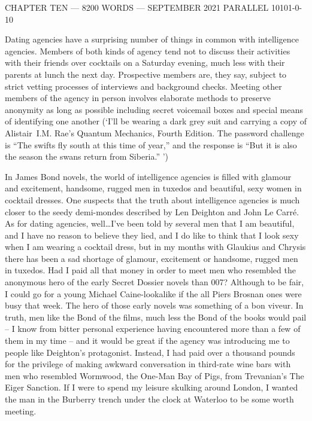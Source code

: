 {\parindent=0pt {\obeylines
{\twelvess CHAPTER TEN --- 8200 WORDS --- SEPTEMBER 2021}
{\twelvess PARALLEL 10101-0-10}}
\vskip 1cm

\twelverm
Dating agencies have a surprising number of things in common with
intelligence agencies. Members of both kinds of agency tend not to
discuss their activities with their friends over cocktails on a
Saturday evening, much less with their parents at lunch the next
day. Prospective members are, they say, subject to strict vetting
processes of interviews and background checks. Meeting other members
of the agency in person involves elaborate methods to preserve
anonymity as long as possible including secret voicemail boxes and
special means of identifying one another (`I'll be wearing a dark
grey suit and carrying a copy of Alistair~I.M. Rae's {\twelvesl
Quantum Mechanics}, Fourth Edition. The password challenge is ``The
swifts fly south at this time of year,'' and the response is ``But
it is also the season the swans return from Siberia.'' ')}

In James Bond novels, the world of intelligence agencies is filled
with glamour and excitement, handsome, rugged men in tuxedos and
beautiful, sexy women in cocktail dresses. One suspects that the
truth about intelligence agencies is much closer to the seedy
demi-mondes described by Len Deighton and John Le Carré. As for
dating agencies, well\dots I've been told by several men that I am
beautiful, and I have no reason to believe they lied, and I do like
to think that I look sexy when I am wearing a cocktail dress, but in
my months with Glaukius and Chrysis there has been a sad shortage of
glamour, excitement or handsome, rugged men in tuxedos. Had I paid
all that money in order to meet men who resembled the anonymous hero
of the early Secret Dossier novels than 007? Although to be fair, I
could go for a young Michael Caine-lookalike if the all Piers
Brosnan ones were busy that week. The hero of those early novels was
something of a {\twelveit bon viveur}. In truth, men like the Bond
of the films, much less the Bond of the books would pail -- I know
from bitter personal experience having encountered more than a few
of them in my time -- and it would be great if the agency was
introducing me to people like Deighton's protagonist. Instead, I had
paid over a thousand pounds for the privilege of making awkward
conversation in third-rate wine bars with men who resembled
Wormwood, the One-Man Bay of Pigs, from Trevanian's {\twelvesl The
Eiger Sanction}. If I were to spend my leisure skulking around
London, I wanted the man in the Burberry trench under the clock at
Waterloo to be some worth meeting.

